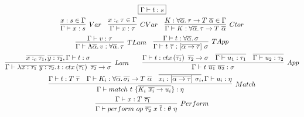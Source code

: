 \documentclass[acmsmall,review,screen]{acmart}
\newcommand{\mathframebox}[1]{\framebox{$\displaystyle #1$}}
\newcommand{\ap}{~}
\newcommand{\ctx}[1]{ctx\left(#1\right)~}
\begin{document}
\begin{figure}
    \begin{gather*}
        \mathframebox{\Gamma\vdash t : s} \\
        \begin{array}{ccc}
            \infer[Var]{\Gamma\vdash x : s}{x : s \in \Gamma} &
            \infer[CVar]{\Gamma\vdash x : \tau}{x :_c \tau \in \Gamma} &
            \infer[Ctor]{\Gamma\vdash K : \forall \overline{\alpha}\ldotp \tau\to T\ap\overline{\alpha}}{K : \forall \overline{\alpha}\ldotp \tau\to T\ap\overline{\alpha} \in \Gamma}
        \end{array} \\
        \begin{array}{cc}
            \infer[TLam]{
                \Gamma\vdash\Lambda\overline{\alpha}\ldotp v : \forall\overline{\alpha}\ldotp\tau
            }{
                \Gamma\vdash v : \tau
            } &
            \infer[TApp]{
                \Gamma\vdash t\ap\overline{\tau} : [\overline{\alpha\to\tau}]\ap\sigma
            }{
                \Gamma \vdash t : \forall\overline{\alpha}\ldotp \sigma
            }
        \end{array} \\
        \infer[Lam]{
            \Gamma\vdash \lambda \overline{x : \tau_1} ~ \overline{y : \tau_2} \ldotp t : \ctx{\overline{\tau_1}} \overline{\tau_2} \to \sigma
        }{
            \overline{x :_c \tau_1}, \overline{y : \tau_2}, \Gamma\vdash t : \sigma
        }
        \text{\hspace{2em}}
        \infer[App]{
            \Gamma\vdash t \ap \overline{u_1} \ap \overline{u_2} : \sigma
        } {
            \Gamma\vdash t : \ctx{\overline{\tau_1}}\overline{\tau_2}\to\sigma
            &
            \overline{\Gamma\vdash u_1 : \tau_1}
            &
            \overline{\Gamma\vdash u_2 : \tau_2}
        }\\
        \infer[Match]{
            \Gamma\vdash match ~ t ~\{ \overline{K_i\ap \overline{x_{i}} \to u_i }\} : \eta
        }{
            \Gamma\vdash t : T \ap\overline{\tau} &
            \Gamma\vdash K_i : \forall \overline{\alpha}\ldotp \overline{\sigma_{i}} \to T\ap\overline{\alpha} &
            \overline{x_{i} : [\overline{\alpha\to\tau}]\ap \sigma_{i}}, \Gamma \vdash u_i : \eta
        }\\
        \infer[Perform]{
            \Gamma\vdash perform \ap op\ap \overline{\tau_2}\ap x\ap \overline{t} : \theta\ap\eta
        }{
            \Gamma\vdash x : T\ap \overline{\tau_1} &
}
\end{gather*}
\end{figure}
\end{document}
